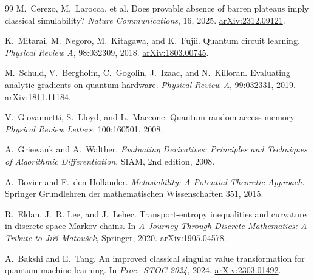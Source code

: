 \documentclass[11pt,a4paper]{article}
\theoremstyle{definition}
\begin{document}
\begin{thebibliography}{99}
M.~Cerezo, M.~Larocca, et al.
\newblock Does provable absence of barren plateaus imply classical simulability?
\newblock \emph{Nature Communications}, 16, 2025.
\newblock \href{https://arxiv.org/abs/2312.09121}{arXiv:2312.09121}.

K.~Mitarai, M.~Negoro, M.~Kitagawa, and K.~Fujii.
\newblock Quantum circuit learning.
\newblock \emph{Physical Review A}, 98:032309, 2018.
\newblock \href{https://arxiv.org/abs/1803.00745}{arXiv:1803.00745}.

M.~Schuld, V.~Bergholm, C.~Gogolin, J.~Izaac, and N.~Killoran.
\newblock Evaluating analytic gradients on quantum hardware.
\newblock \emph{Physical Review A}, 99:032331, 2019.
\newblock \href{https://arxiv.org/abs/1811.11184}{arXiv:1811.11184}.

V.~Giovannetti, S.~Lloyd, and L.~Maccone.
\newblock Quantum random access memory.
\newblock \emph{Physical Review Letters}, 100:160501, 2008.

A.~Griewank and A.~Walther.
\newblock \emph{Evaluating Derivatives: Principles and Techniques of Algorithmic Differentiation}.
\newblock SIAM, 2nd edition, 2008.

A.~Bovier and F.~den Hollander.
\newblock \emph{Metastability: A Potential-Theoretic Approach}.
\newblock Springer Grundlehren der mathematischen Wissenschaften 351, 2015.

R.~Eldan, J.~R. Lee, and J.~Lehec.
\newblock Transport-entropy inequalities and curvature in discrete-space Markov chains.
\newblock In \emph{A Journey Through Discrete Mathematics: A Tribute to Ji\v{r}\'{\i} Matou\v{s}ek}, Springer, 2020.
\newblock \href{https://arxiv.org/abs/1905.04578}{arXiv:1905.04578}.

A.~Bakshi and E.~Tang.
\newblock An improved classical singular value transformation for quantum machine learning.
\newblock In \emph{Proc.\ STOC 2024}, 2024.
\newblock \href{https://arxiv.org/abs/2303.01492}{arXiv:2303.01492}.

\end{thebibliography}
\end{document}

